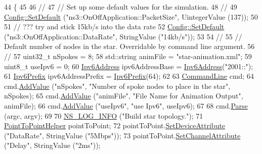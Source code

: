 \begin{DoxyCode}
44 \{
45 
46   \textcolor{comment}{//}
47   \textcolor{comment}{// Set up some default values for the simulation.}
48   \textcolor{comment}{//}
49   \hyperlink{group__config_ga2e7882df849d8ba4aaad31c934c40c06}{Config::SetDefault} (\textcolor{stringliteral}{"ns3::OnOffApplication::PacketSize"}, UintegerValue (137));
50 
51   \textcolor{comment}{// ??? try and stick 15kb/s into the data rate}
52   \hyperlink{group__config_ga2e7882df849d8ba4aaad31c934c40c06}{Config::SetDefault} (\textcolor{stringliteral}{"ns3::OnOffApplication::DataRate"}, StringValue (\textcolor{stringliteral}{"14kb/s"}));
53 
54   \textcolor{comment}{//}
55   \textcolor{comment}{// Default number of nodes in the star.  Overridable by command line argument.}
56   \textcolor{comment}{//}
57   uint32\_t nSpokes = 8;
58   std::string animFile = \textcolor{stringliteral}{"star-animation.xml"};
59   uint8\_t useIpv6 = 0;
60   \hyperlink{classns3_1_1Ipv6Address}{Ipv6Address} ipv6AddressBase = \hyperlink{classns3_1_1Ipv6Address}{Ipv6Address}(\textcolor{stringliteral}{"2001::"});
61   \hyperlink{classns3_1_1Ipv6Prefix}{Ipv6Prefix} ipv6AddressPrefix = \hyperlink{classns3_1_1Ipv6Prefix}{Ipv6Prefix}(64);
62 
63   \hyperlink{classns3_1_1CommandLine}{CommandLine} cmd;
64   cmd.\hyperlink{classns3_1_1CommandLine_addcfb546c7ad4c8bd0965654d55beb8e}{AddValue} (\textcolor{stringliteral}{"nSpokes"}, \textcolor{stringliteral}{"Number of spoke nodes to place in the star"}, nSpokes);
65   cmd.\hyperlink{classns3_1_1CommandLine_addcfb546c7ad4c8bd0965654d55beb8e}{AddValue} (\textcolor{stringliteral}{"animFile"},  \textcolor{stringliteral}{"File Name for Animation Output"}, animFile);
66   cmd.\hyperlink{classns3_1_1CommandLine_addcfb546c7ad4c8bd0965654d55beb8e}{AddValue} (\textcolor{stringliteral}{"useIpv6"},   \textcolor{stringliteral}{"use Ipv6"}, useIpv6);
67 
68   cmd.\hyperlink{classns3_1_1CommandLine_a5c10b85b3207e5ecb48d907966923156}{Parse} (argc, argv);
69 
70   \hyperlink{group__logging_gafbd73ee2cf9f26b319f49086d8e860fb}{NS\_LOG\_INFO} (\textcolor{stringliteral}{"Build star topology."});
71   \hyperlink{classns3_1_1PointToPointHelper}{PointToPointHelper} pointToPoint;
72   pointToPoint.\hyperlink{classns3_1_1PointToPointHelper_a4577f5ab8c387e5528af2e0fbab1152e}{SetDeviceAttribute} (\textcolor{stringliteral}{"DataRate"}, StringValue (\textcolor{stringliteral}{"5Mbps"}));
73   pointToPoint.\hyperlink{classns3_1_1PointToPointHelper_a6b5317fd17fb61e5a53f8d66a90b63b9}{SetChannelAttribute} (\textcolor{stringliteral}{"Delay"}, StringValue (\textcolor{stringliteral}{"2ms"}));

\end{DoxyCode}
